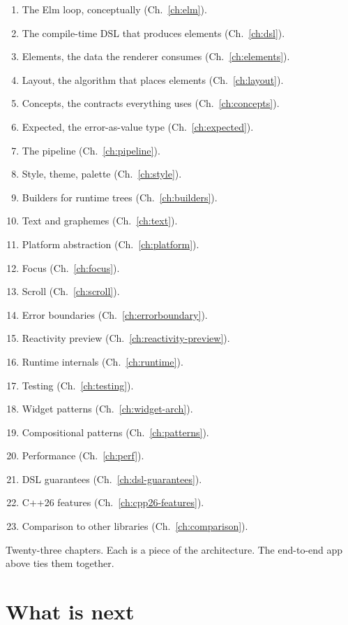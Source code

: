 \begin{enumerate}[leftmargin=*]
  \item The Elm loop, conceptually (Ch.~\ref{ch:elm}).
  \item The compile-time DSL that produces elements
    (Ch.~\ref{ch:dsl}).
  \item Elements, the data the renderer consumes
    (Ch.~\ref{ch:elements}).
  \item Layout, the algorithm that places elements
    (Ch.~\ref{ch:layout}).
  \item Concepts, the contracts everything uses
    (Ch.~\ref{ch:concepts}).
  \item Expected, the error-as-value type (Ch.~\ref{ch:expected}).
  \item The pipeline (Ch.~\ref{ch:pipeline}).
  \item Style, theme, palette (Ch.~\ref{ch:style}).
  \item Builders for runtime trees (Ch.~\ref{ch:builders}).
  \item Text and graphemes (Ch.~\ref{ch:text}).
  \item Platform abstraction (Ch.~\ref{ch:platform}).
  \item Focus (Ch.~\ref{ch:focus}).
  \item Scroll (Ch.~\ref{ch:scroll}).
  \item Error boundaries (Ch.~\ref{ch:errorboundary}).
  \item Reactivity preview (Ch.~\ref{ch:reactivity-preview}).
  \item Runtime internals (Ch.~\ref{ch:runtime}).
  \item Testing (Ch.~\ref{ch:testing}).
  \item Widget patterns (Ch.~\ref{ch:widget-arch}).
  \item Compositional patterns (Ch.~\ref{ch:patterns}).
  \item Performance (Ch.~\ref{ch:perf}).
  \item DSL guarantees (Ch.~\ref{ch:dsl-guarantees}).
  \item C++26 features (Ch.~\ref{ch:cpp26-features}).
  \item Comparison to other libraries (Ch.~\ref{ch:comparison}).
\end{enumerate}

Twenty-three chapters. Each is a piece of the architecture. The
end-to-end app above ties them together.

\section{What is next}

